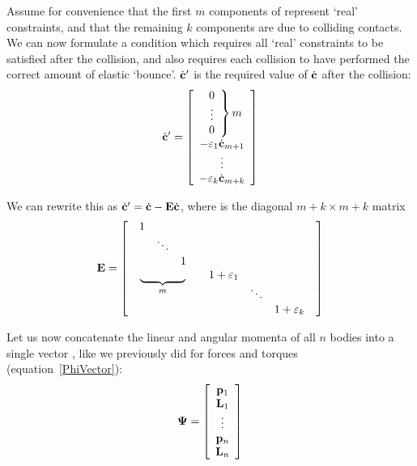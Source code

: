 Assume for convenience that the first $m$ components of  represent `real' constraints, and
that the remaining $k$ components are due to colliding contacts. We can now formulate a condition
which requires all `real' constraints to be satisfied after the collision, and also requires each
collision to have performed the correct amount of elastic `bounce'. $\dot{\ve{c}}'$ is the
required value of $\dot{\ve{c}}$ after the collision:
\begin{equation}
\dot{\ve{c}}' = \left[\begin{array}[m]{c}
    \left. \begin{array}{c} 0 \\\vdots\\ 0 \end{array} \right\} m \\
    -\varepsilon_1 \dot{\ve{c}}_{m+1} \\\vdots\\
    -\varepsilon_k \dot{\ve{c}}_{m+k}
    \end{array}\right]
\end{equation}

We can rewrite this as $\dot{\ve{c}}' = \dot{\ve{c}} - \m{E}\dot{\ve{c}}$, where  is the
diagonal $m+k \times m+k$ matrix
\begin{equation}
\m{E} = \left[ \begin{array}{cc}
    \begin{array}{ccc} 1 \\ & \ddots \\ && 1 \end{array} \\
    \underbrace{\quad\quad\quad\quad}_m &
    \begin{array}[t]{ccc} 1+\varepsilon_1 \\ & \ddots \\ && 1+\varepsilon_k \end{array}
    \end{array} \right]
\end{equation}

Let us now concatenate the linear and angular momenta of all $n$ bodies into a single vector
\ve{\Psi}, like we previously did for forces and torques (equation~\ref{PhiVector}):
\begin{equation} \label{PsiVector}
\ve{\Psi} = \left[\begin{array}{c}
    \ve{p}_1 \\ \ve{L}_1 \\ \vdots \\ \ve{p}_n \\ \ve{L}_n \end{array}\right]
\end{equation}

